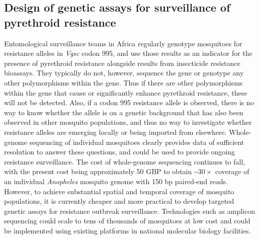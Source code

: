\documentclass[a4paper,11pt,abstracton,hidelinks]{scrartcl}
\begin{document}
\subsection*{Design of genetic assays for surveillance of pyrethroid resistance}

%
Entomological surveillance teams in Africa regularly genotype mosquitoes for resistance alleles in \textit{Vgsc} codon 995, and use those results as an indicator for the presence of pyrethroid resistance alongside results from insecticide resistance bioassays.
%
They typically do not, however, sequence the gene or genotype any other polymorphisms within the gene.
%
Thus if there are other polymorphisms within the gene that cause or significantly enhance pyrethroid resistance, these will not be detected.
%
Also, if a codon 995 resistance allele is observed, there is no way to know whether the allele is on a genetic background that has also been observed in other mosquito populations, and thus no way to investigate whether resistance alleles are emerging locally or being imported from elsewhere.
%
Whole-genome sequencing of individual mosquitoes clearly provides data of sufficient resolution to answer these questions, and could be used to provide ongoing resistance surveillance.
%
The cost of whole-genome sequencing continues to fall, with the present cost being approximately 50 GBP to obtain \textasciitilde$30\times$ coverage of an individual \emph{Anopheles} mosquito genome with 150 bp paired-end reads.
%
However, to achieve substantial spatial and temporal coverage of mosquito populations, it is currently cheaper and more practical to develop targeted genetic assays for resistance outbreak surveillance.
%
Technologies such as amplicon sequencing \cite{Kilianski2015} could scale to tens of thousands of mosquitoes at low cost and could be implemented using existing platforms in national molecular biology facilities.
%
\end{document}
